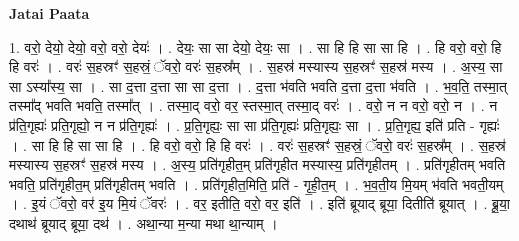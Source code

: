 \documentclass[17pt]{extarticle}
\begin{document}
\textbf{Jatai Paata} \newline

1. वरो॒ देयो॒ देयो॒ वरो॒ वरो॒ देयः॑ । . देयः॒ सा सा देयो॒ देयः॒ सा । . सा हि हि सा सा हि । . हि वरो॒ वरो॒ हि हि वरः॑ । . वरः॑ स॒हस्रꣳ॑ स॒हस्रं॒ ॅवरो॒ वरः॑ स॒हस्र᳚म् । . स॒हस्र॑ मस्यास्य स॒हस्रꣳ॑ स॒हस्र॑ मस्य । . अ॒स्य॒ सा सा ऽस्या᳚स्य॒ सा । . सा द॒त्ता द॒त्ता सा सा द॒त्ता । . द॒त्ता भ॑वति भवति द॒त्ता द॒त्ता भ॑वति । . भ॒व॒ति॒ तस्मा॒त् तस्मा᳚द् भवति भवति॒ तस्मा᳚त् । . तस्मा॒द् वरो॒ वर॒ स्तस्मा॒त् तस्मा॒द् वरः॑ । . वरो॒ न न वरो॒ वरो॒ न । . न प्र॑ति॒गृह्यः॑ प्रति॒गृह्यो॒ न न प्र॑ति॒गृह्यः॑ । . प्र॒ति॒गृह्यः॒ सा सा प्र॑ति॒गृह्यः॑ प्रति॒गृह्यः॒ सा । . प्र॒ति॒गृह्य॒ इति॑ प्रति - गृह्यः॑ । . सा हि हि सा सा हि । . हि वरो॒ वरो॒ हि हि वरः॑ । . वरः॑ स॒हस्रꣳ॑ स॒हस्रं॒ ॅवरो॒ वरः॑ स॒हस्र᳚म् । . स॒हस्र॑ मस्यास्य स॒हस्रꣳ॑ स॒हस्र॑ मस्य । . अ॒स्य॒ प्रति॑गृहीत॒म् प्रति॑गृहीत मस्यास्य॒ प्रति॑गृहीतम् । . प्रति॑गृहीतम् भवति भवति॒ प्रति॑गृहीत॒म् प्रति॑गृहीतम् भवति । . प्रति॑गृहीत॒मिति॒ प्रति॑ - गृ॒ही॒त॒म् । . भ॒व॒ती॒य मि॒यम् भ॑वति भवती॒यम् । . इ॒यं ॅवरो॒ वर॑ इ॒य मि॒यं ॅवरः॑ । . वर॒ इतीति॒ वरो॒ वर॒ इति॑ । . इति॑ ब्रूयाद् ब्रूया॒ दितीति॑ ब्रूयात् । . ब्रू॒या॒ दथाथ॑ ब्रूयाद् ब्रूया॒ दथ॑ । . अथा॒न्या म॒न्या मथा था॒न्याम् । \newline
\end{document}
